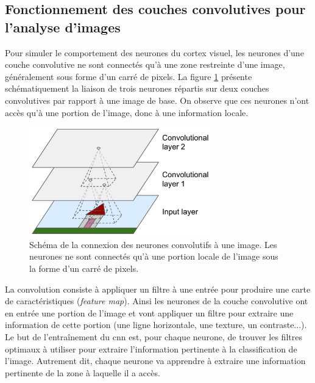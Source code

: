 \subsection{Fonctionnement des couches convolutives pour l'analyse d'images}
Pour simuler le comportement des neurones du cortex visuel, les neurones d'une couche convolutive ne sont connectés qu'à une zone restreinte d'une image, généralement sous forme d'un carré de pixels. La figure \ref{fig:conv_simple} présente schématiquement la liaison de trois neurones répartis sur deux couches convolutives par rapport à une image de base. On observe que ces neurones n'ont accès qu'à une portion de l'image, donc à une information locale. 
\begin{figure}[!ht]
 \centering
 \includegraphics[width=0.7\textwidth]{figures/conv_simple.png}
 \caption[Schéma de la connection des neurones convolutifs à une image]{Schéma de la connexion des neurones convolutifs à une image. Les neurones ne sont connectés qu'à une portion locale de l'image sous la forme d'un carré de pixels.}
 \label{fig:conv_simple}
\end{figure}


La convolution consiste à appliquer un filtre à une entrée pour produire une carte de caractéristiques (\textit{feature map}). Ainsi les neurones de la couche convolutive ont en entrée une portion de l'image et vont appliquer un filtre pour extraire une information de cette portion (une ligne horizontale, une texture, un contraste...). Le but de l'entraînement du \gls{cnn} est, pour chaque neurone, de trouver les filtres optimaux à utiliser pour extraire l'information pertinente à la classification de l'image. Autrement dit, chaque neurone va apprendre à extraire une information pertinente de la zone à laquelle il a accès.


